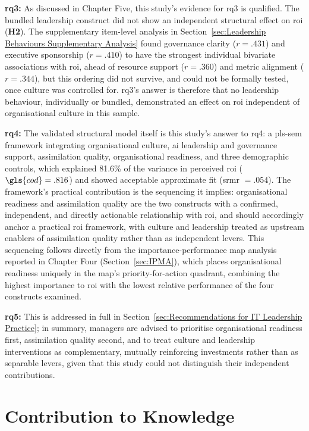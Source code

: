 \textbf{\gls{rq3}:} As discussed in Chapter Five, this study's evidence for \gls{rq3} is qualified. The bundled leadership construct did not show an independent structural effect on \gls{roi} (\textbf{H2}). The supplementary item-level analysis in Section~\ref{sec:Leadership Behaviours Supplementary Analysis} found governance clarity ($r = .431$) and executive sponsorship ($r = .410$) to have the strongest individual bivariate associations with \gls{roi}, ahead of resource support ($r = .360$) and metric alignment ($r = .344$), but this ordering did not survive, and could not be formally tested, once culture was controlled for. \gls{rq3}'s answer is therefore that no leadership behaviour, individually or bundled, demonstrated an effect on \gls{roi} independent of organisational culture in this sample.

\textbf{\gls{rq4}:} The validated structural model itself is this study's answer to \gls{rq4}: a \gls{pls-sem} framework integrating organisational culture, \gls{ai} leadership and governance support, assimilation quality, organisational readiness, and three demographic controls, which explained 81.6\% of the variance in perceived \gls{roi} ($\gls{cod} = .816$) and showed acceptable approximate fit (\gls{srmr} $= .054$). The framework's practical contribution is the sequencing it implies: organisational readiness and assimilation quality are the two constructs with a confirmed, independent, and directly actionable relationship with \gls{roi}, and should accordingly anchor a practical \gls{roi} framework, with culture and leadership treated as upstream enablers of assimilation quality rather than as independent levers. This sequencing follows directly from the importance-performance map analysis reported in Chapter Four (Section~\ref{sec:IPMA}), which places organisational readiness uniquely in the map's priority-for-action quadrant, combining the highest importance to \gls{roi} with the lowest relative performance of the four constructs examined.

\textbf{\gls{rq5}:} This is addressed in full in Section~\ref{sec:Recommendations for IT Leadership Practice}; in summary, managers are advised to prioritise organisational readiness first, assimilation quality second, and to treat culture and leadership interventions as complementary, mutually reinforcing investments rather than as separable levers, given that this study could not distinguish their independent contributions.

\section{Contribution to Knowledge}
\label{sec:Contribution to Knowledge}
